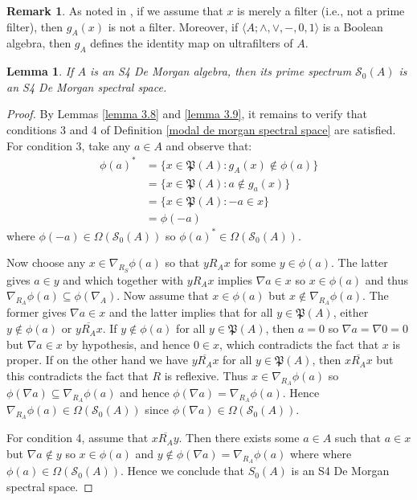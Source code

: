\documentclass{amsart}
\theoremstyle{plain}
\newtheorem{lemma}[theorem]{Lemma}
\theoremstyle{definition}
\newtheorem{remark}[theorem]{Remark}
\begin{document}
\begin{remark}
    As noted in \cite{bimbo}, if we assume that $x$ is merely a filter (i.e., not a prime filter), then $g_A(x)$ is not a filter. Moreover, if $\langle A;\wedge,\vee,-,0,1\rangle$ is a Boolean algebra, then $g_A$ defines the identity map on ultrafilters of $A$.    
\end{remark}
\begin{lemma}\label{lemma 3.11}
    If $A$ is an S4 De Morgan algebra, then its prime spectrum $\mathcal{S}_0(A)$ is an S4 De Morgan spectral space. 
\end{lemma}
\begin{proof}
    By Lemmas \ref{lemma 3.8} and \ref{lemma 3.9}, it remains to verify that conditions 3 and 4 of Definition \ref{modal de morgan spectral space} are satisfied. For condition 3, take any $a\in A$ and observe that: 
    \begin{align*}
\phi(a)^*&=\{x\in\mathfrak{P}(A):g_A(x)\not\in\phi(a)\}\\&=\{x\in\mathfrak{P}(A):a\not\in g_a(x)\}
\\&=\{x\in\mathfrak{P}(A):-a\in x\}\\&=\phi(-a)
\end{align*}
where $\phi(-a)\in\Omega(\mathcal{S}_0(A))$ so $\phi(a)^*\in\Omega(\mathcal{S}_0(A))$.


Now choose any $x\in\nabla_{R_S}\phi(a)$ so that $yR_Ax$ for some $y\in\phi(a)$. The latter gives $a\in y$ and which together with $yR_Ax$ implies $\nabla a\in x$ so $x\in\phi(a)$ and thus $\nabla_{R_A}\phi(a)\subseteq\phi(\nabla_A)$. Now assume that $x\in\phi(a)$ but $x\not\in \nabla_{R_A}\phi(a)$. The former gives $\nabla a\in x$ and the latter implies that for all $y\in\mathfrak{P}(A)$, either $y\not\in\phi(a)$ or $y\overline{R_A}x$. If $y\not\in\phi(a)$ for all $y\in\mathfrak{P}(A)$, then $a=0$ so $\nabla a=\nabla 0=0$ but $\nabla a\in x$ by hypothesis, and hence $0\in x$, which contradicts the fact that $x$ is proper. If on the other hand we have $y\overline{R_A}x$ for all $y\in\mathfrak{P}(A)$, then $x\overline{R_A}x$ but this contradicts the fact that $R$ is reflexive. Thus $x\in\nabla_{R_A}\phi(a)$ so $\phi(\nabla a)\subseteq \nabla_{R_A}\phi(a)$ and hence $\phi(\nabla a)=\nabla_{R_A}\phi(a)$. Hence $\nabla_{R_A}\phi(a)\in\Omega(\mathcal{S}_0(A))$ since $\phi(\nabla a)\in\Omega(\mathcal{S}_0(A))$.


For condition 4, assume that $x\overline{R_A}y$. Then there exists some $a\in A$ such that $a\in x$ but $\nabla a\not\in y$ so $x\in\phi(a)$ and $y\not\in\phi(\nabla a)=\nabla_{R_A}\phi(a)$ where where $\phi(a)\in\Omega(\mathcal{S}_0(A))$. Hence we conclude that $S_0(A)$ is an S4 De Morgan spectral space. 
\end{proof}
\end{document}
